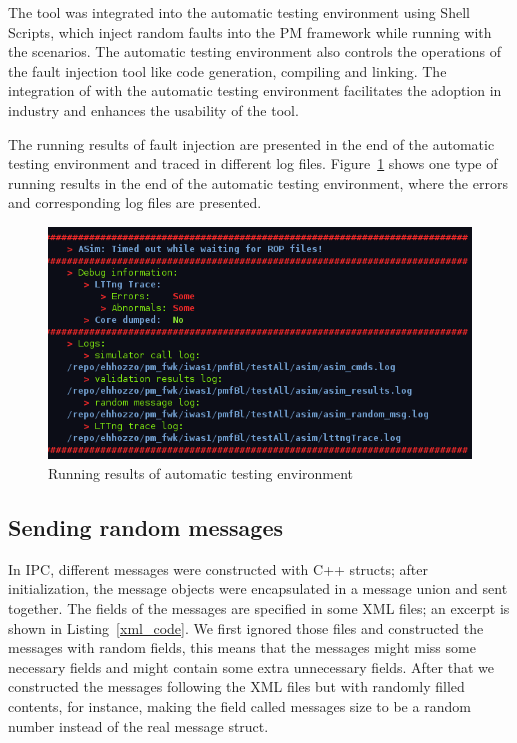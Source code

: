 The \approach{} tool was integrated into the automatic testing environment using Shell Scripts, which inject random faults into the PM framework while running with the scenarios. The automatic testing environment also controls the operations of the fault injection tool like code generation, compiling and linking. The integration of \approach{} with  the automatic testing environment facilitates the adoption in industry and enhances the usability of the tool.


The running results of fault injection are presented in the end of the automatic testing environment and traced in different log files. Figure~\ref{terminal} shows one type of running results in the end of the automatic testing environment, where the errors and corresponding log files are presented.

\begin{figure}[!ht]
\centering
\includegraphics[width=\columnwidth]{figure/terminal.PNG}
\caption{Running results of automatic testing environment \label{terminal}}
\end{figure}


\subsection{Sending random messages}\label{sec:sendingRandomMessages}
In IPC, different messages were constructed with C++ structs; after initialization, the message objects were encapsulated in a message union and sent together. The fields of the messages are specified in some XML files; an excerpt is shown in Listing~\ref{xml_code}. We first ignored those files and constructed the messages with random fields, this means that the messages might miss some necessary fields and might contain some extra unnecessary fields. After that we constructed the messages following the XML files but with randomly filled contents, for instance, making the field called messages size to be a random number instead of the real message struct.         

